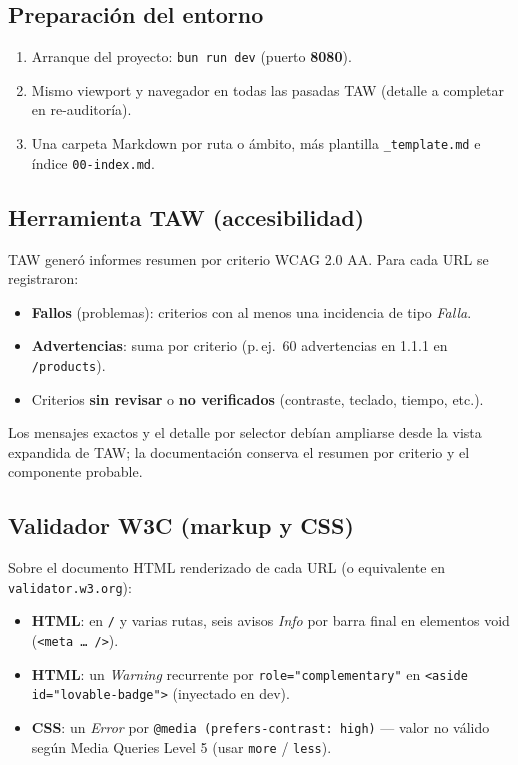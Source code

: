 \documentclass[11pt,a4paper]{article}
\begin{document}
\subsection{Preparación del entorno}

\begin{enumerate}[noitemsep]
  \item Arranque del proyecto: \texttt{bun run dev} (puerto \textbf{8080}).
  \item Mismo viewport y navegador en todas las pasadas TAW (detalle a completar en re-auditoría).
  \item Una carpeta Markdown por ruta o ámbito, más plantilla \texttt{\_template.md} e índice \texttt{00-index.md}.
\end{enumerate}

\subsection{Herramienta TAW (accesibilidad)}

TAW generó informes resumen por criterio WCAG 2.0 AA. Para cada URL se registraron:
\begin{itemize}[noitemsep]
  \item \textbf{Fallos} (problemas): criterios con al menos una incidencia de tipo \emph{Falla}.
  \item \textbf{Advertencias}: suma por criterio (p.\,ej.\ 60 advertencias en 1.1.1 en \texttt{/products}).
  \item Criterios \textbf{sin revisar} o \textbf{no verificados} (contraste, teclado, tiempo, etc.).
\end{itemize}

Los mensajes exactos y el detalle por selector debían ampliarse desde la vista expandida de TAW; la documentación conserva el resumen por criterio y el componente probable.

\subsection{Validador W3C (markup y CSS)}

Sobre el documento HTML renderizado de cada URL (o equivalente en \texttt{validator.w3.org}):
\begin{itemize}[noitemsep]
  \item \textbf{HTML}: en \texttt{/} y varias rutas, seis avisos \emph{Info} por barra final en elementos void (\texttt{<meta … />}).
  \item \textbf{HTML}: un \emph{Warning} recurrente por \texttt{role="complementary"} en \texttt{<aside id="lovable-badge">} (inyectado en dev).
  \item \textbf{CSS}: un \emph{Error} por \texttt{@media (prefers-contrast: high)} --- valor no válido según Media Queries Level 5 (usar \texttt{more} / \texttt{less}).
\end{itemize}
\end{document}
